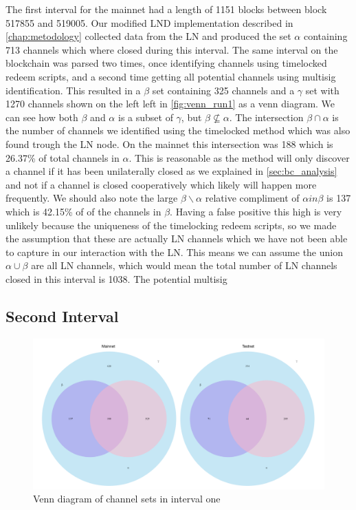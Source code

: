 The first interval for the mainnet had a length of 1151 blocks between block 517855 and 519005. Our modified LND implementation described in \cref{chap:metodology} collected data from the LN and produced the set \( \alpha \) containing 713 channels which where closed during this interval. The same interval on the blockchain was parsed two times, once identifying channels using timelocked redeem scripts, and a second time getting all potential channels using multisig identification. This resulted in a \( \beta \) set containing 325 channels and a \( \gamma \) set with 1270 channels shown on the left left in \cref{fig:venn_run1} as a venn diagram. We can see how both \( \beta \) and \(\alpha\) is a subset of \( \gamma\), but \(\beta \not\subseteq \alpha\). The intersection \(\beta \cap \alpha\) is the number of channels we identified using the timelocked method which was also found trough the LN node. On the mainnet this intersection was 188 which is 26.37\% of total channels in \( \alpha \). This is reasonable as the method will only discover a channel if it has been unilaterally closed as we explained in \cref{sec:bc_analysis} and not if a channel is closed cooperatively which likely will happen more frequently. We should also note the large \( \beta \backslash{} \alpha \) relative compliment of \( \alpha in \beta \) is 137 which is 42.15\% of of the channels in \(\beta\). Having a false positive this high is very unlikely because the uniqueness of the timelocking redeem scripts, so we made the assumption that these are actually LN channels which we have not been able to capture in our interaction with the LN. 
This means we can assume the union \(\alpha \cup \beta \) are all LN channels, which would mean the total number of LN channels closed in this interval is 1038. The potential multisig 




\subsection{Second Interval}


\begin{figure}[h]
    \centering
    \includegraphics[width=16cm]{figures/graphs/venn_full1.png}
    \caption{Venn diagram of channel sets in interval one}
    \label{fig:venn_run2}
\end{figure}



